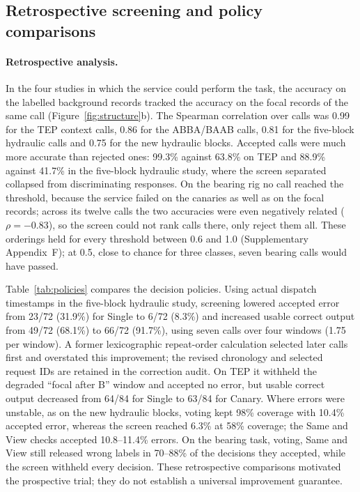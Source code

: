 \documentclass[11pt,a4paper]{article}
\begin{document}
\subsection{Retrospective screening and policy comparisons}\label{sec:canary_results}
\paragraph{Retrospective analysis.} In the four studies in which the service could perform the task, the accuracy on the labelled background records tracked the accuracy on the focal records of the same call (Figure~\ref{fig:structure}b). The Spearman correlation over calls was 0.99 for the TEP context calls, 0.86 for the ABBA/BAAB calls, 0.81 for the five-block hydraulic calls and 0.75 for the new hydraulic blocks. Accepted calls were much more accurate than rejected ones: 99.3\% against 63.8\% on TEP and 88.9\% against 41.7\% in the five-block hydraulic study, where the screen separated collapsed from discriminating responses. On the bearing rig no call reached the threshold, because the service failed on the canaries as well as on the focal records; across its twelve calls the two accuracies were even negatively related ($\rho=-0.83$), so the screen could not rank calls there, only reject them all. These orderings held for every threshold between 0.6 and 1.0 (Supplementary Appendix~F); at 0.5, close to chance for three classes, seven bearing calls would have passed.

Table~\ref{tab:policies} compares the decision policies. Using actual dispatch timestamps in the five-block hydraulic study, screening lowered accepted error from 23/72 (31.9\%) for Single to 6/72 (8.3\%) and increased usable correct output from 49/72 (68.1\%) to 66/72 (91.7\%), using seven calls over four windows (1.75 per window). A former lexicographic repeat-order calculation selected later calls first and overstated this improvement; the revised chronology and selected request IDs are retained in the correction audit. On TEP it withheld the degraded ``focal after B'' window and accepted no error, but usable correct output decreased from 64/84 for Single to 63/84 for Canary. Where errors were unstable, as on the new hydraulic blocks, voting kept 98\% coverage with 10.4\% accepted error, whereas the screen reached 6.3\% at 58\% coverage; the Same and View checks accepted 10.8--11.4\% errors. On the bearing task, voting, Same and View still released wrong labels in 70--88\% of the decisions they accepted, while the screen withheld every decision. These retrospective comparisons motivated the prospective trial; they do not establish a universal improvement guarantee.
\end{document}
